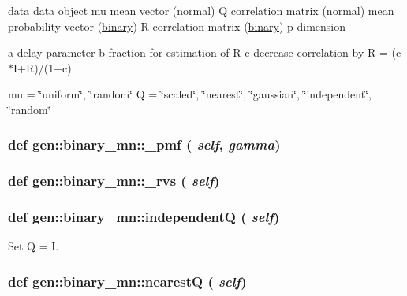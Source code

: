 data data object mu mean vector (normal) Q correlation matrix (normal) mean probability vector (\hyperlink{classgen_1_1binary}{binary}) R correlation matrix (\hyperlink{classgen_1_1binary}{binary}) p dimension

a delay parameter b fraction for estimation of R c decrease correlation by R = (c$\ast$I+R)/(1+c)

mu = \char`\"{}uniform\char`\"{}, \char`\"{}random\char`\"{} Q = \char`\"{}scaled\char`\"{}, \char`\"{}nearest\char`\"{}, \char`\"{}gaussian\char`\"{}, \char`\"{}independent\char`\"{}, \char`\"{}random\char`\"{} \hypertarget{classgen_1_1binary__mn_a6f0dd2bcf5dc7087ce71b982408a963}{
\subsubsection[{\_\-pmf}]{\setlength{\rightskip}{0pt plus 5cm}def gen::binary\_\-mn::\_\-pmf ( {\em self}, \/   {\em gamma})}}
\label{classgen_1_1binary__mn_a6f0dd2bcf5dc7087ce71b982408a963}


\hypertarget{classgen_1_1binary__mn_281d5cb707dd1b6845c3aa9d63a5558e}{
\subsubsection[{\_\-rvs}]{\setlength{\rightskip}{0pt plus 5cm}def gen::binary\_\-mn::\_\-rvs ( {\em self})}}
\label{classgen_1_1binary__mn_281d5cb707dd1b6845c3aa9d63a5558e}


\hypertarget{classgen_1_1binary__mn_95f12365524907d99c52f77c36e53ba9}{
\subsubsection[{independentQ}]{\setlength{\rightskip}{0pt plus 5cm}def gen::binary\_\-mn::independentQ ( {\em self})}}
\label{classgen_1_1binary__mn_95f12365524907d99c52f77c36e53ba9}


Set Q = I. 

\hypertarget{classgen_1_1binary__mn_98267c7b73f23c23331312345685bbee}{
\subsubsection[{nearestQ}]{\setlength{\rightskip}{0pt plus 5cm}def gen::binary\_\-mn::nearestQ ( {\em self})}}
\label{classgen_1_1binary__mn_98267c7b73f23c23331312345685bbee}


